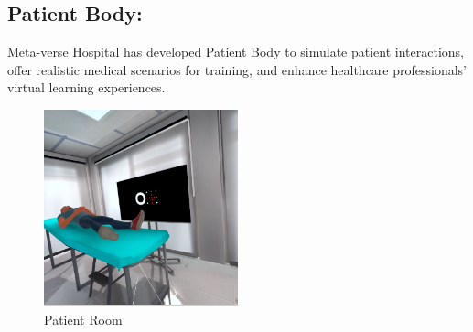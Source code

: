 \subsection{Patient Body:}	
Meta-verse Hospital has developed Patient Body to simulate patient interactions, offer realistic medical scenarios for training, and enhance healthcare professionals' virtual learning experiences.
\begin{figure}[h]
	\centering
	\includegraphics[width=0.5\textwidth, height=0.3\textheight]{Images/Patient Body.png}
	\caption{Patient Room}
	\label{fig:system-diagram}
\end{figure}	

	